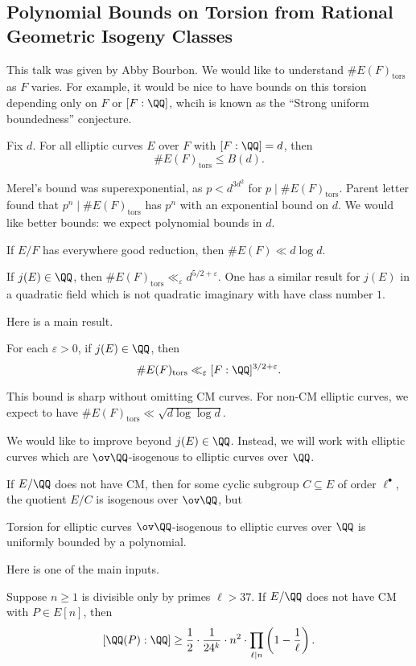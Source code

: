 \documentclass{article}
\begin{document}
\subsection{Polynomial Bounds on Torsion from Rational Geometric Isogeny Classes}
This talk was given by Abby Bourbon. We would like to understand $\#E(F)_{\mathrm{tors}}$ as $F$ varies. For example, it would be nice to have bounds on this torsion depending only on $F$ or $[F:\QQ]$, whcih is known as the ``Strong uniform boundedness'' conjecture.
\begin{theorem}[Merel]
	Fix $d$. For all elliptic curves $E$ over $F$ with $[F:\QQ]=d$, then
	\[\#E(F)_{\mathrm{tors}}\le B(d).\]
\end{theorem}
Merel's bound was superexponential, as $p<d^{3d^2}$ for $p\mid\#E(F)_{\mathrm{tors}}$. Parent letter found that $p^n\mid\#E(F)_{\mathrm{tors}}$ has $p^n$ with an exponential bound on $d$. We would like better bounds: we expect polynomial bounds in $d$.
\begin{example}
	If $E/F$ has everywhere good reduction, then $\#E(F)\ll d\log d$.
\end{example}
\begin{example}
	If $j(E)\in\QQ$, then $\#E(F)_{\mathrm{tors}}\ll_\varepsilon d^{5/2+\varepsilon}$. One has a similar result for $j(E)$ in a quadratic field which is not quadratic imaginary with have class number $1$.
\end{example}
Here is a main result.
\begin{theorem}
	For each $\varepsilon>0$, if $j(E)\in\QQ$, then
	\[\#E(F)_{\mathrm{tors}}\ll_\varepsilon[F:\QQ]^{3/2+\varepsilon}.\]
\end{theorem}
\begin{remark}
	This bound is sharp without omitting CM curves. For non-CM elliptic curves, we expect to have $\#E(F)_{\mathrm{tors}}\ll\sqrt{d\log\log d}$.
\end{remark}
We would like to improve beyond $j(E)\in\QQ$. Instead, we will work with elliptic curves which are $\ov\QQ$-isogenous to elliptic curves over $\QQ$.
\begin{example}
	If $E/\QQ$ does not have CM, then for some cyclic subgroup $C\subseteq E$ of order $\ell^\bullet$, the quotient $E/C$ is isogenous over $\ov\QQ$, but 
\end{example}
\begin{theorem}
	Torsion for elliptic curves $\ov\QQ$-isogenous to elliptic curves over $\QQ$ is uniformly bounded by a polynomial.
\end{theorem}
Here is one of the main inputs.
\begin{proposition}
	Suppose $n\ge1$ is divisible only by primes $\ell>37$. If $E/\QQ$ does not have CM with $P\in E[n]$, then
	\[[\QQ(P):\QQ]\ge\frac12\cdot\frac1{24^k}\cdot n^2\cdot\prod_{\ell\mid n}\left(1-\frac1\ell\right).\]
\end{proposition}
\end{document}
